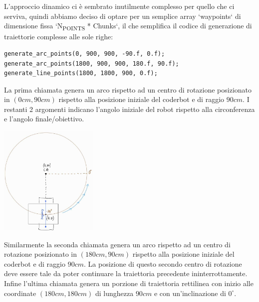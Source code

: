 \documentclass[11pt]{article}
\begin{document}
L'approccio dinamico ci è sembrato inutilmente complesso per quello che ci serviva, quindi abbiamo deciso di optare per un semplice array `waypoints` di dimensione fissa `N\textsubscript{POINTS} * Chunks`, il che semplifica il codice di generazione di traiettorie complesse alle sole righe:
\begin{verbatim}
generate_arc_points(0, 900, 900, -90.f, 0.f);
generate_arc_points(1800, 900, 900, 180.f, 90.f);
generate_line_points(1800, 1800, 900, 0.f);
\end{verbatim}

La prima chiamata genera un arco rispetto ad un centro di rotazione posizionato in \((0cm,90cm)\) rispetto alla posizione iniziale del coderbot e di raggio \(90cm\). I restanti 2 argomenti indicano l'angolo iniziale del robot rispetto alla circonferenza e l'angolo finale/obiettivo.

\begin{center}
\includegraphics[height=200]{./img/gen_arc_example.jpg}
\end{center}

Similarmente la seconda chiamata genera un arco rispetto ad un centro di rotazione posizionato in \((180cm,90cm)\) rispetto alla posizione iniziale del coderbot e di raggio \(90cm\). La posizione di questo secondo centro di rotazione deve essere tale da poter continuare la traiettoria precedente ininterrottamente.
Infine l'ultima chiamata genera un porzione di traiettoria rettilinea con inizio alle coordinate \((180cm, 180cm)\) di lunghezza \(90cm\) e con un'inclinazione di \(0^\circ\).
\end{document}
